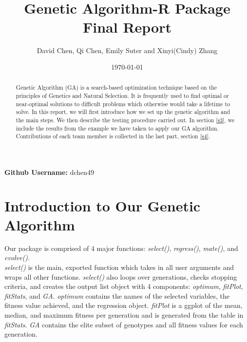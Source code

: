 \documentclass{article}
\begin{document}


\graphicspath{ {GA/} }

\title{\LARGE Genetic Algorithm-R Package Final Report}
\author{David Chen, Qi Chen, Emily Suter and Xinyi(Cindy) Zhang}


\date{\today}

\maketitle

\begin{abstract}
Genetic Algorithm (GA) is a search-based optimization technique based on the principles of Genetics and Natural Selection. It is frequently used to find optimal or near-optimal solutions to difficult problems which otherwise would take a lifetime to solve. In this report, we will first introduce how we set up the genetic algorithm and the main steps. We then describe the testing procedure carried out. In section \ref{s3}, we include the results from the example we have taken to apply our GA algorithm. Contributions of each team member is collected in the last part, section \ref{s4}.
\end{abstract}

\begin{center}
\textbf{Github Username:} dchen49
\end{center}

\newpage
\pagestyle{empty}

\section{Introduction to Our Genetic Algorithm}\label{s1}

Our package is comprised of 4 major functions: \textit{select()}, \textit{regress()}, \textit{mate()}, and \textit{evolve()}.\\

\textit{select()} is the main, exported function which takes in all user arguments and wraps all other functions. \textit{select()} also loops over generations, checks stopping criteria, and creates the output list object with 4 components: \textit{optimum}, \textit{fitPlot}, \textit{fitStats}, and \textit{GA}. \textit{optimum} contains the names of the selected variables, the fitness value achieved, and the regression object. \textit{fitPlot} is a ggplot of the mean, median, and maximum fitness per generation and is generated from the table in \textit{fitStats}. \textit{GA} contains the elite subset of genotypes and all fitness values for each generation.\\
\end{document}
